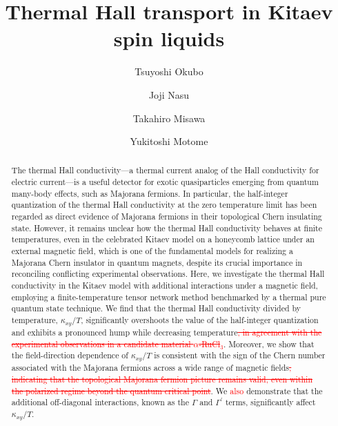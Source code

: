 \documentclass[twocolumn,superscriptaddress,showpacs, longbibliography, aps, prx]{revtex4-2}
\newcommand{\red}[1]{\textcolor{red}{#1}}
\newcommand{\redsout}[1]{\textcolor{red}{\sout{#1}}}
\begin{document}
\title{Thermal Hall transport in Kitaev spin liquids}
\author{Tsuyoshi Okubo}
\author{Joji Nasu}
\author{Takahiro Misawa}
\author{Yukitoshi Motome}

\begin{abstract}
The thermal Hall conductivity---a thermal current analog of the Hall conductivity for electric current---is a useful detector for exotic quasiparticles emerging from quantum many-body effects, such as Majorana fermions.
In particular, the half-integer quantization of the thermal Hall conductivity at the zero temperature limit has been regarded as direct evidence of Majorana fermions in their topological Chern insulating state. 
However, it remains unclear how the thermal Hall conductivity behaves at finite temperatures, even in the celebrated Kitaev model on a honeycomb lattice under an external magnetic field, which is one of the fundamental models for realizing a Majorana Chern insulator in quantum magnets, despite its crucial importance in reconciling conflicting experimental observations. 
Here, we investigate the thermal Hall conductivity in the Kitaev model with additional interactions under a magnetic field, employing a finite-temperature tensor network method benchmarked by a thermal pure quantum state technique. 
We find that the thermal Hall conductivity divided by temperature, $\kappa_{xy}/T$, significantly overshoots the value of the half-integer quantization and exhibits a pronounced hump while decreasing temperature\redsout{, in agreement with the experimental observations in a candidate material $\alpha$-RuCl$_{3}$}. 
Moreover, we show that the field-direction dependence of $\kappa_{xy}/T$ is consistent with the sign of the Chern number associated with the Majorana fermions across a wide range of magnetic fields\redsout{, indicating that the topological Majorana fermion picture remains valid, even within the polarized regime beyond the quantum critical point}. 
We \red{also} demonstrate that the additional off-diagonal interactions, known as the $\Gamma$ and $\Gamma^{\prime}$ terms, significantly affect $\kappa_{xy}/T$. 

\end{abstract}
\end{document}
